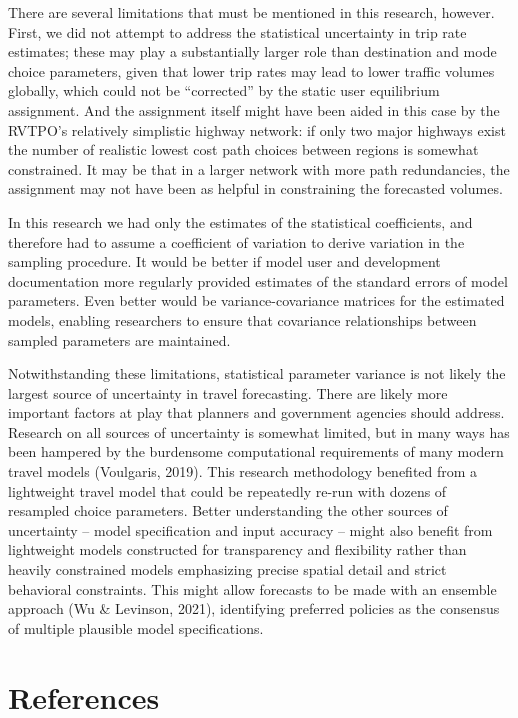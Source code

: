 \documentclass[fancy, masters, twoside]{byuthesis}
\begin{document}
There are several limitations that must be mentioned in this research, however. First, we did not attempt to address the statistical uncertainty in trip rate estimates; these may play a substantially larger role than destination and mode choice parameters, given that lower trip rates may lead to lower traffic volumes globally, which could not be ``corrected'' by the static user equilibrium assignment. And the assignment itself might have been aided in this case by the RVTPO's relatively simplistic highway network: if only two major highways exist the number of realistic lowest cost path choices between regions is somewhat constrained. It may be that in a larger network with more path redundancies, the assignment may not have been as helpful in constraining the forecasted volumes.

In this research we had only the estimates of the statistical coefficients, and therefore had to assume a coefficient of variation to derive variation in the sampling procedure. It would be better if model user and development documentation more regularly provided estimates of the standard errors of model parameters. Even better would be variance-covariance matrices for the estimated models, enabling researchers to ensure that covariance relationships between sampled parameters are maintained.

Notwithstanding these limitations, statistical parameter variance is not likely the largest source of uncertainty in travel forecasting. There are likely more important factors at play that planners and government agencies should address. Research on all sources of uncertainty is somewhat limited, but in many ways has been hampered by the burdensome computational requirements of many modern travel models (Voulgaris, 2019). This research methodology benefited from a lightweight travel model that could be repeatedly re-run with dozens of resampled choice parameters. Better understanding the other sources of uncertainty -- model specification and input accuracy -- might also benefit from lightweight models constructed for transparency and flexibility rather than heavily constrained models emphasizing precise spatial detail and strict behavioral constraints. This might allow forecasts to be made with an ensemble approach (Wu \& Levinson, 2021), identifying preferred policies as the consensus of multiple plausible model specifications.

\hypertarget{references}{%
\chapter*{References}\label{references}}
\end{document}
